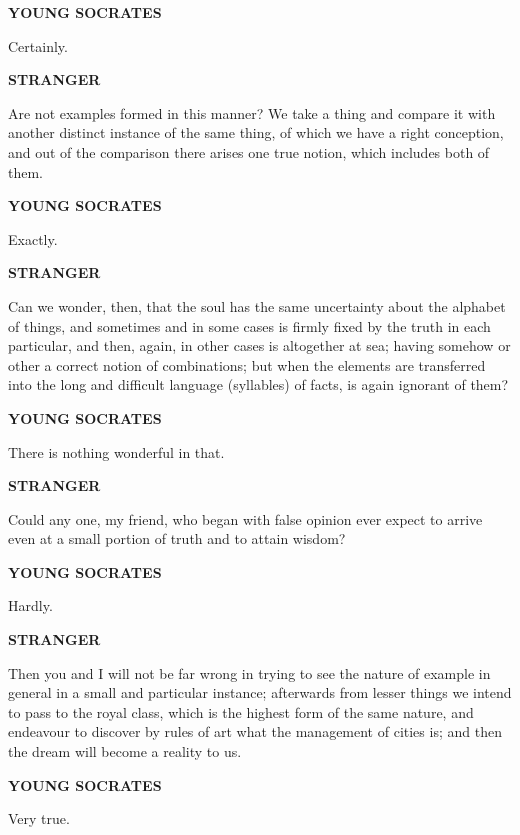\documentclass[11pt,letter]{article}
\begin{document}
\par \textbf{YOUNG SOCRATES}
\par   Certainly.

\par \textbf{STRANGER}
\par   Are not examples formed in this manner? We take a thing and compare it with another distinct instance of the same thing, of which we have a right conception, and out of the comparison there arises one true notion, which includes both of them.

\par \textbf{YOUNG SOCRATES}
\par   Exactly.

\par \textbf{STRANGER}
\par   Can we wonder, then, that the soul has the same uncertainty about the alphabet of things, and sometimes and in some cases is firmly fixed by the truth in each particular, and then, again, in other cases is altogether at sea; having somehow or other a correct notion of combinations; but when the elements are transferred into the long and difficult language (syllables) of facts, is again ignorant of them?

\par \textbf{YOUNG SOCRATES}
\par   There is nothing wonderful in that.

\par \textbf{STRANGER}
\par   Could any one, my friend, who began with false opinion ever expect to arrive even at a small portion of truth and to attain wisdom?

\par \textbf{YOUNG SOCRATES}
\par   Hardly.

\par \textbf{STRANGER}
\par   Then you and I will not be far wrong in trying to see the nature of example in general in a small and particular instance; afterwards from lesser things we intend to pass to the royal class, which is the highest form of the same nature, and endeavour to discover by rules of art what the management of cities is; and then the dream will become a reality to us.

\par \textbf{YOUNG SOCRATES}
\par   Very true.
\end{document}
